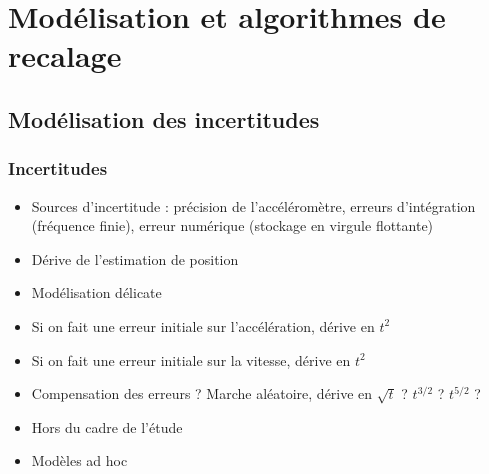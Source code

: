 \documentclass[11pt]{beamer}
\begin{document}
\section{Modélisation et algorithmes de recalage}
\subsection{Modélisation des incertitudes}
\begin{frame}
  \frametitle{Incertitudes}
\begin{itemize}
\item Sources d'incertitude : précision de l'accéléromètre, erreurs
  d'intégration (fréquence finie), erreur numérique (stockage en
  virgule flottante)
\item Dérive de l'estimation de position
\item Modélisation délicate
\item Si on fait une erreur initiale sur l'accélération, dérive en
  $t^{2}$
\item Si on fait une erreur initiale sur la vitesse, dérive en
  $t^{2}$
\item Compensation des erreurs ? Marche aléatoire, dérive en $\sqrt t$
  ? $t^{3/2}$ ? $t^{5/2}$ ?
\item Hors du cadre de l'étude
\item Modèles ad hoc
\end{itemize}
\end{frame}
\end{document}
